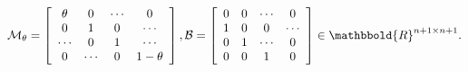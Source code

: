 \documentclass[9pt]{beamer}
\begin{document}
\begin{frame}
\begin{itemize}
{{\begin{align*}
\end{align*}}
{\small
\begin{align*}
\mathcal{M}_{\theta}=\left[ \begin{array}{cccc}
   \theta &0&  \cdots & 0 \\  
   0 & 1  & 0&\cdots \\ 
   \cdots &0 & 1 &\cdots  \\
   0 &\cdots & 0 &1-\theta \\
   \end{array}  \right],
\mathcal{B} = \left[ \begin{array}{cccc}
   0 & 0& \cdots & 0 \\  
   1 & 0 &0 & \cdots \\ 
   0 &1   & \cdots& 0 \\
   0 & 0 & 1 & 0 \\
   \end{array}  \right]\in\mathbbold{R}^{n+1\times n+1}.
\end{align*}}
}

\end{itemize}

\end{frame}

\end{document}
